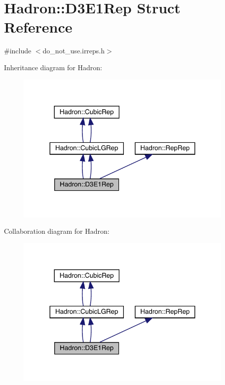 \hypertarget{structHadron_1_1D3E1Rep}{}\section{Hadron\+:\+:D3\+E1\+Rep Struct Reference}
\label{structHadron_1_1D3E1Rep}


{\ttfamily \#include $<$do\+\_\+not\+\_\+use.\+irreps.\+h$>$}



Inheritance diagram for Hadron\+:\nopagebreak
\begin{figure}[H]
\begin{center}
\leavevmode
\includegraphics[width=300pt]{d8/d04/structHadron_1_1D3E1Rep__inherit__graph}
\end{center}
\end{figure}


Collaboration diagram for Hadron\+:\nopagebreak
\begin{figure}[H]
\begin{center}
\leavevmode
\includegraphics[width=300pt]{d6/db5/structHadron_1_1D3E1Rep__coll__graph}
\end{center}
\end{figure}

